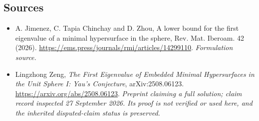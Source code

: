 \documentclass[11pt]{article}
\begin{document}
\subsection{Sources}
\begin{itemize}
\item[S1]A. Jimenez, C. Tapia Chinchay and D. Zhou, A lower bound for the first eigenvalue of a minimal hypersurface in the sphere, Rev. Mat. Iberoam. 42 (2026).
\url{https://ems.press/journals/rmi/articles/14299110}.
\textit{Formulation source.}
\item[E1]Lingzhong Zeng, \emph{The First Eigenvalue of Embedded Minimal Hypersurfaces in the Unit Sphere I: Yau's Conjecture}, arXiv:2508.06123.
\url{https://arxiv.org/abs/2508.06123}.
\textit{Preprint claiming a full solution; claim record inspected 27 September 2026. Its proof is not verified or used here, and the inherited disputed-claim status is preserved.}
\end{itemize}
\end{document}
